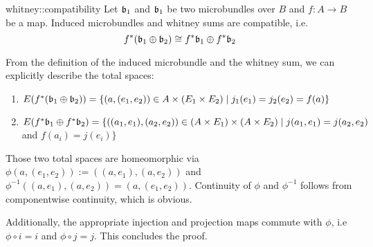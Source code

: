 \begin{mylemma}{whitney::compatibility}
    Let $\mathfrak{b}_1$ and $\mathfrak{b}_1$ be two microbundles over $B$ and $f: A \to B$ be a map.
    Induced microbundles and whitney sums are compatible, i.e.
    \[ f^*(\mathfrak{b}_1 \oplus \mathfrak{b}_2) \cong f^*\mathfrak{b}_1 \oplus f^*\mathfrak{b}_2 \]
\end{mylemma}
\begin{myproof}
    From the definition of the induced microbundle and the whitney sum, we can explicitly describe the total spaces:
    \begin{enumerate}
        \item $E(f^*(\mathfrak{b}_1 \oplus \mathfrak{b}_2)) = \{(a, (e_1, e_2)) \in A \times (E_1 \times E_2) \mid j_1(e_1) = j_2(e_2) = f(a) \}$
        \item $E(f^*\mathfrak{b}_1 \oplus f^*\mathfrak{b}_2) = \{((a_1, e_1), (a_2, e_2)) \in (A \times E_1) \times (A \times E_2) \mid j(a_1, e_1) = j(a_2, e_2)$ and $f(a_i) = j(e_i)\}$
    \end{enumerate}
    Those two total spaces are homeomorphic via $\phi(a, (e_1, e_2)) := ((a, e_1), (a, e_2))$ and
    $\phi^{-1}((a, e_1), (a, e_2)) = (a, (e_1, e_2))$. Continuity of $\phi$ and $\phi^{-1}$ follows from componentwise continuity, which is obvious.
    
    Additionally, the appropriate injection and projection maps commute with $\phi$, i.e $\phi \circ i = i$ and $\phi \circ j = j$.
    This concludes the proof. 
\end{myproof}